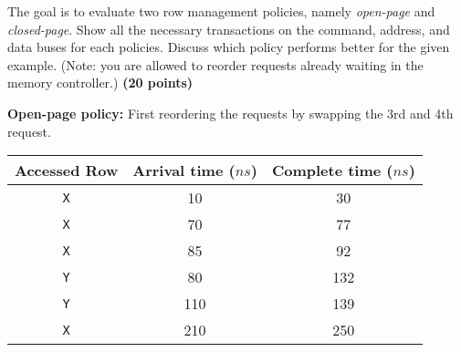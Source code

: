 \documentclass[a4paper, 11pt]{exam}
\begin{document}
\begin{enumerate}
The goal is to evaluate two row management policies, namely \textit{open-page} and \textit{closed-page}.
Show all the necessary transactions on the command, address, and data buses for each policies.
Discuss which policy performs better for the given example.
(Note: you are allowed to reorder requests already waiting in the memory controller.)
\textbf{(20 points)}

\textbf{Open-page policy:} First reordering the requests by swapping the 3rd and 4th request.

\begin{center}
	\begin{tabular}{|c|c|c|}
		\hline
		\textbf{Accessed Row} & \textbf{Arrival time ($ns$)} & \textbf{Complete time ($ns$)} \\
		\hline
		\texttt{X}  & 10 & 30\\
		\hline
		\texttt{X}  & 70 & 77\\
		\hline
		\texttt{X}  & 85 & 92\\
		\hline
		\texttt{Y}  & 80 & 132\\
		\hline
		\texttt{Y}  & 110 & 139\\
		\hline
		\texttt{X} & 210 & 250\\
		\hline
	\end{tabular}
\end{center}


\end{enumerate}
\end{document}
